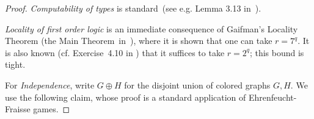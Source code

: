 \begin{proof}%

\emph{Computability of types} is standard~(see e.g. Lemma 3.13 in~\cite{libkin}).

\emph{Locality of first order logic} is an
immediate consequence of Gaifman's Locality Theorem
(the Main Theorem~in~\cite{gaifman1982local}),
where it is shown that one can take $r=7^q$.
It is also known (cf. Exercise~4.10 in \cite{libkin}) that it suffices to take $r=2^q$; this bound is tight.


%

For \emph{Independence}, write $G\oplus H$ for the disjoint union of colored graphs $G,H$. 
We use the following claim, whose proof is a standard application of Ehrenfeucht-Fraisse games.



\end{proof}
